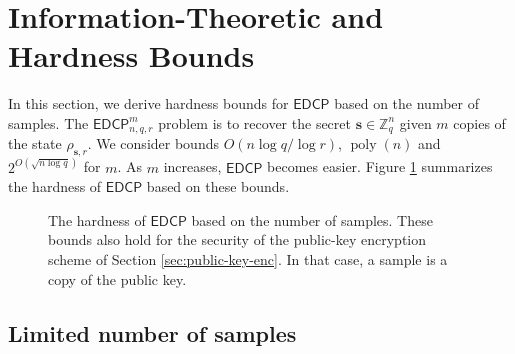 \documentclass[11pt]{article}
\theoremstyle{plain}
\theoremstyle{definition}
\DeclareMathOperator{\poly}{poly}
\def\Z{\mathbb{Z}}
\def\lwe{\mathsf{LWE}}
\def\edcp{\mathsf{EDCP}}
\begin{document}



\section{Information-Theoretic and Hardness Bounds}
\label{sec:hardness}

In this section, we derive hardness bounds for $\edcp$ based on the number of samples. The $\edcp_{n, q, r}^m$ problem is to recover the secret $\bm{s} \in \Z_q^n$ given $m$ copies of the state $\rho_{\bm{s}, r}$. We consider bounds $O( n\log q / \log r)$, $\poly(n)$ and $2^{O(\sqrt{n \log q})}$ for $m$. As $m$ increases, $\edcp$ becomes easier. Figure \ref{fig:hardness-bounds} summarizes the hardness of $\edcp$ based on these bounds.  

\begin{figure}
    \centering
    \caption{The hardness of $\edcp$ based on the number of samples. These bounds also hold for the security of the public-key encryption scheme of Section \ref{sec:public-key-enc}. In that case, a sample is a copy of the public key.}
    \label{fig:hardness-bounds}
\end{figure}





\subsection{Limited number of samples}
\label{sec:hardness-limited}
\end{document}
